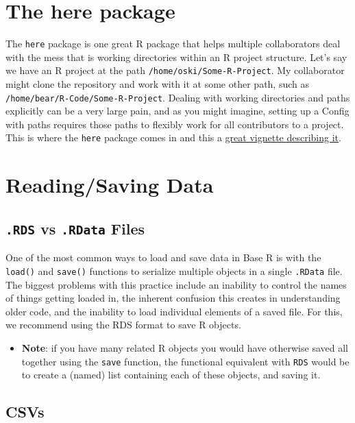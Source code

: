 \documentclass[]{book}
\providecommand{\tightlist}{%
  \setlength{\itemsep}{0pt}\setlength{\parskip}{0pt}}
\begin{document}
\section{The here package}\label{the-here-package}

The \texttt{here} package is one great R package that helps multiple
collaborators deal with the mess that is working directories within an R
project structure. Let's say we have an R project at the path
\texttt{/home/oski/Some-R-Project}. My collaborator might clone the
repository and work with it at some other path, such as
\texttt{/home/bear/R-Code/Some-R-Project}. Dealing with working
directories and paths explicitly can be a very large pain, and as you
might imagine, setting up a Config with paths requires those paths to
flexibly work for all contributors to a project. This is where the
\texttt{here} package comes in and this a
\href{https://github.com/jennybc/here_here}{great vignette describing
it}.

\section{Reading/Saving Data}\label{readingsaving-data}

\subsection{\texorpdfstring{\texttt{.RDS} vs \texttt{.RData}
Files}{.RDS vs .RData Files}}\label{rds-vs-.rdata-files}

One of the most common ways to load and save data in Base R is with the
\texttt{load()} and \texttt{save()} functions to serialize multiple
objects in a single \texttt{.RData} file. The biggest problems with this
practice include an inability to control the names of things getting
loaded in, the inherent confusion this creates in understanding older
code, and the inability to load individual elements of a saved file. For
this, we recommend using the RDS format to save R objects.

\begin{itemize}
\tightlist
\item
  \textbf{Note}: if you have many related R objects you would have
  otherwise saved all together using the \texttt{save} function, the
  functional equivalent with \texttt{RDS} would be to create a (named)
  list containing each of these objects, and saving it.
\end{itemize}

\subsection{CSVs}\label{csvs}
\end{document}

